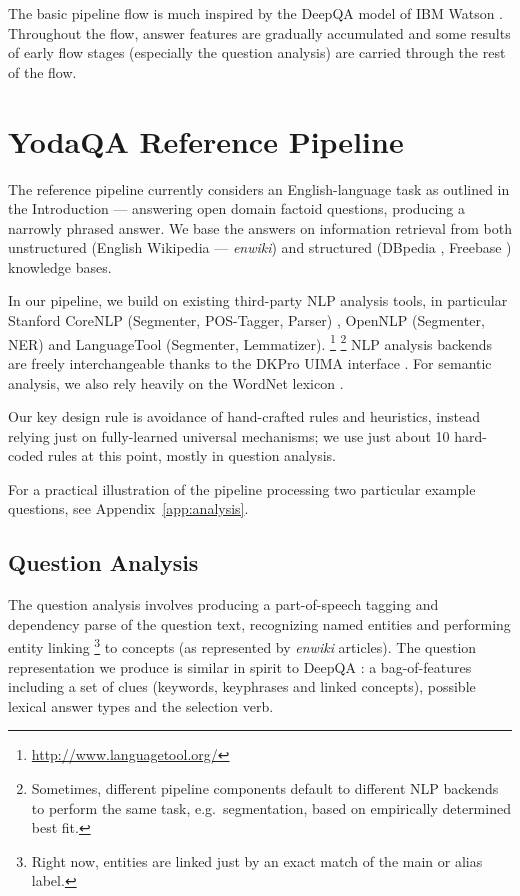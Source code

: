 The basic pipeline flow is much inspired by the Deep\-QA model
of IBM Watson \citep{WatsonPipeline}.  Throughout the flow, answer features
are gradually accumulated and some results of early flow stages (especially
the question analysis) are carried through the rest of the flow.


\section{YodaQA Reference Pipeline}
\label{sec:yodaqarefpip}

The reference pipeline currently considers an English-language task
as outlined in the Introduction --- answering open domain
factoid questions, producing a narrowly phrased answer.
We base the answers on information retrieval from both
unstructured (English Wikipedia --- \textit{enwiki})
and structured (DBpedia \citep{dbpedia}, Freebase \citep{freebase})
knowledge bases.

In our pipeline, we build on existing third-party NLP analysis tools,
in particular Stanford CoreNLP (Segmenter, POS-Tagger, Parser) \citep{StanfordCoreNLP} \citep{StanfordNNParser},
OpenNLP (Segmenter, NER) \citep{OpenNLP} and LanguageTool (Segmenter, Lemmatizer).%
\footnote{\url{http://www.languagetool.org/}}%
\footnote{Sometimes, different pipeline components default to different
NLP backends to perform the same task, e.g.\ segmentation,
based on empirically determined best fit.}
NLP analysis backends are freely interchangeable thanks
to the DKPro UIMA interface \citep{DKPro}.
For semantic analysis, we also rely heavily on the WordNet lexicon \citep{WordNet}.

Our key design rule is avoidance of hand-crafted rules and heuristics,
instead relying just on fully-learned universal mechanisms;
we use just about 10 hard-coded rules at this point, mostly
in question analysis.

For a practical illustration of the pipeline processing
two particular example questions,
see Appendix~\ref{app:analysis}.


\subsection{Question Analysis}

The question analysis involves
producing a part-of-speech tagging and dependency parse of the question text,
recognizing named entities and
performing entity linking%
\footnote{Right now, entities are linked just by an exact match of the main or alias label.}
to concepts (as represented by \textit{enwiki} articles).
The question representation we produce is similar in spirit
to DeepQA \cite{WatsonQuestion}: a bag-of-features including
a set of clues (keywords, keyphrases and linked concepts),
possible lexical answer types and the selection verb.

